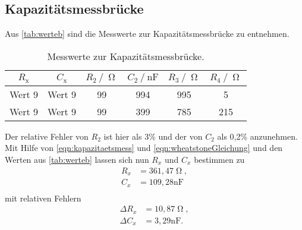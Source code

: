 \subsection{Kapazitätsmessbrücke}
Aus \autoref{tab:werteb} sind die Messwerte zur Kapazitätsmessbrücke zu entnehmen.
\begin{table}[H]
  \centering
  \caption{Messwerte zur Kapazitätsmessbrücke.}
  \label{tab:werteb} 
  \begin{tabular}{c c c c c c}
    \toprule
    $R_{\text{x}}$ & $C_{\text{x}}$ & $R_{\text{2}} \:/\: \upOmega$ & $C_{\text{2}} \:/\: \si{\nano\farad}$ & $R_{\text{3}} \:/\: \upOmega$ & $R_{\text{4}} \:/\: \upOmega$ \\
    \midrule
    Wert 9 & Wert 9 & 99 & 994 & 995 & 5 \\
    Wert 9 & Wert 9 & 99 & 399 & 785 & 215 \\
    \bottomrule
  \end{tabular}
\end{table}
Der relative Fehler von $R_2$ ist hier als 3\% und der von $C_2$ als 0,2\% anzunehmen. Mit Hilfe von \autoref{eqn:kapazitaetsmess} und \autoref{eqn:wheatstoneGleichung} und den
Werten aus \autoref{tab:werteb} lassen sich nun $R_x$ und $C_x$ bestimmen zu
\begin{align*}
  R_x &= 361,47 \upOmega, \\
  C_x &= 109,28 \si{\nano\farad} \\
\end{align*}
mit relativen Fehlern
\begin{align*}
  \Delta R_x &= 10,87 \upOmega, \\
  \Delta C_x &= 3,29 \si{\nano\farad} . \\
\end{align*}


